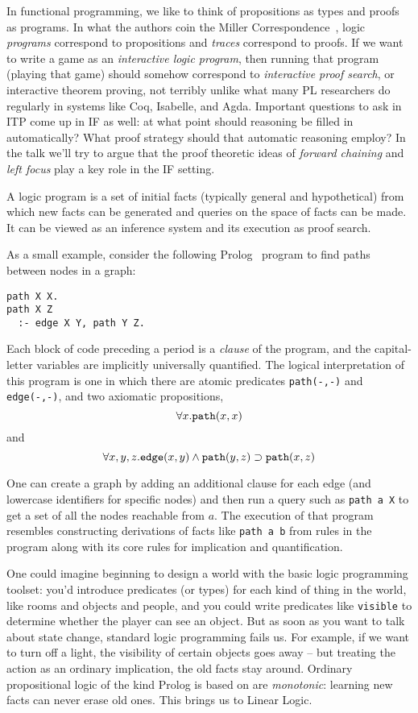 \renewcommand{\implies}{\supset}

In functional programming, we like to think of propositions as
types and proofs as programs. In what the authors coin the Miller
Correspondence~\cite{millertalk}, logic {\em programs} correspond to propositions
and {\em traces} correspond to proofs. If we want to write a game as an
{\em interactive logic program}, then running that program (playing that
game) should somehow correspond to {\em interactive proof search}, or
interactive theorem proving, not terribly unlike what many PL researchers
do regularly in systems like Coq, Isabelle, and Agda. Important questions
to ask in ITP come up in IF as well: at what point should reasoning be
filled in automatically? What proof strategy should that automatic
reasoning employ? In the talk we'll try to argue that the proof theoretic
ideas of {\em forward chaining} and {\em left focus} play a key role in the
IF setting.

A logic program is a set of initial facts (typically general and
hypothetical) from which new facts can be generated and queries on the
space of facts can be made. It can be viewed as an inference system and its
execution as proof search.

As a small example, consider the following
Prolog~\cite{Covington:1996:PPD:230996} program to
find paths between nodes in a graph:

\begin{verbatim}
path X X.
path X Z
  :- edge X Y, path Y Z.
\end{verbatim}

Each block of code preceding a period is a {\em clause} of the program, and
the capital-letter variables are implicitly universally quantified.
The logical interpretation of this program is one in which there are atomic
predicates \verb|path(-,-)| and \verb|edge(-,-)|, and two axiomatic
propositions, 
\[\forall x.\verb|path|(x, x)\] 
and 
\[\forall x,y,z.\verb|edge|(x, y) \land \verb|path|(y, z) \implies 
\verb|path|(x, z)\]

One can create a graph by adding an additional clause for each edge (and
lowercase identifiers for specific nodes) and then run a query such as
\verb|path a X| to get a set of all the nodes reachable from $a$. The
execution of that program resembles constructing derivations of facts like
\verb|path a b| from rules in the program along with its core rules for
implication and quantification.

One could imagine beginning to design a world with the basic logic
programming toolset: you'd introduce predicates (or types) for each kind of
thing in the world, like rooms and objects and people, and you could write
predicates like \verb|visible| to determine whether the player can see an
object. But as soon as you want to talk about state change, standard logic
programming fails us. For example, if we want to turn off a light, the
visibility of certain objects goes away -- but treating the action as an
ordinary implication, the old facts stay around. Ordinary propositional
logic of the kind Prolog is based on are {\em monotonic}: learning new
facts can never erase old ones. This brings us to Linear Logic.

